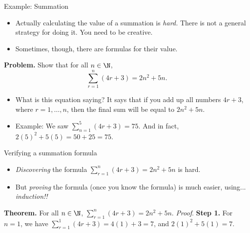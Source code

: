 \documentclass[11pt,aspectratio=1610,handout]{beamer}
\begin{document}
		\begin{frame}{Example: Summation}
			\begin{itemize}
				\item Actually calculating the value of a summation is \emph{hard.} There is not a general strategy for doing it. You need to be creative. 
				\item Sometimes, though, there are formulas for their value.
			\end{itemize}
			\vspace{2mm}\p
			
			\textbf{Problem.} Show that for all $n \in \N$, 
			\[
			\sum_{r=1}^n (4r + 3) = 2n^2 + 5n.
			\]
			\begin{itemize}
				\item What is this equation saying? It says that if you add up all numbers $4r + 3$, where $r = 1, \ldots, n$, then the final sum will be equal to $2n^2 + 5n$. 
				\item Example: We saw $\displaystyle \sum_{n=1}^5 (4r + 3) = 75$. And in fact, $2(5)^2 + 5(5) = 50 + 25 = 75$. 
			\end{itemize}
		\end{frame}
		
		\begin{frame}{Verifying a summation formula}
			\vspace{-15mm}
			
			\begin{itemize}
				\item \emph{Discovering} the formula $\displaystyle \sum_{r=1}^n(4r+3) = 2n^2 + 5n$ is hard. 
				\item But \emph{proving} the formula (once you know the formula) is much easier, using... \emph{induction!!}
			\end{itemize}\p
			
			
			\vspace{10mm}
			\textbf{Theorem.} For all $n \in \N$, $\displaystyle \sum_{r=1}^n (4r+3) = 2n^2 + 5n$. 
			\newline \newline\p 
			\emph{Proof}. \textbf{Step 1.} For $n=1$, we have $\sum_{r=1}^1 (4r + 3) = 4(1) + 3 = 7$, and $2(1)^2 + 5(1) = 7$. 
		\end{frame}
		
\end{document}
